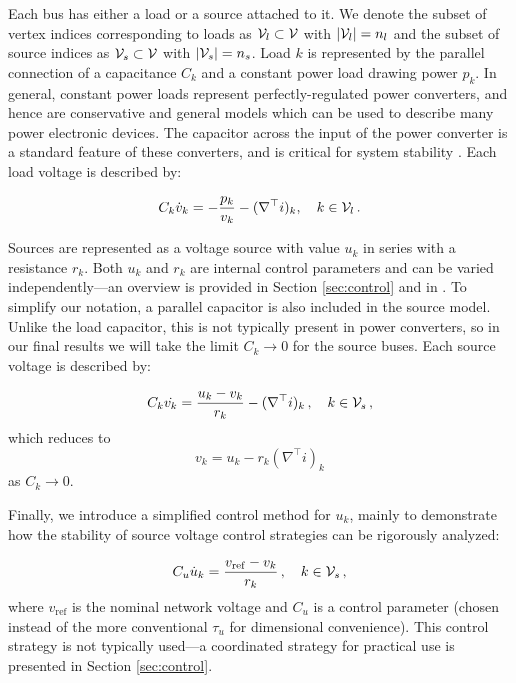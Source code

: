 \documentclass[letterpaper, 10 pt, conference]{ieeeconf}
\begin{document}
Each bus has either a load or a source attached to it. We denote the subset of vertex indices corresponding to loads as ${\cal V}_l \subset {\cal V}$ with $|{\cal V}_l| = n_l$ and the subset of source indices as ${\cal V}_s \subset {\cal V}$ with $|{\cal V}_s| = n_s$. Load $k$ is represented by the parallel connection of a capacitance $C_k$ and a constant power load drawing power $p_k$. In general, constant power loads represent perfectly-regulated power converters, and hence are conservative and general models which can be used to describe many power electronic devices. The capacitor across the input of the power converter is a standard feature of these converters, and is critical for system stability \cite{Cezar:2015io}. Each load voltage is described by:

\begin{equation}
    C_k \dot{v}_k = -\frac{p_k}{v_k} - (\nabla^\top i)_k, \quad k \in {\cal V}_l\,.
\end{equation}

Sources are represented as a voltage source with value $u_k$ in series with a resistance $r_k$. Both $u_k$ and $r_k$ are internal control parameters and can be varied independently---an overview is provided in Section \ref{sec:control} and in \cite{GuerreroHierarchy,GuerreroDroop}. To simplify our notation, a parallel capacitor is also included in the source model. Unlike the load capacitor, this is not typically present in power converters, so in our final results we will take the limit $C_k \to 0$ for the source buses. Each source voltage is described by:

\begin{equation}
    C_k \dot{v_k} = \frac{u_k - v_k}{r_k} - (\nabla^\top i)_k\,, \quad k \in {\cal V}_s\,,
\end{equation}
which reduces to 
\begin{equation}\label{eq:alg}
    v_k = u_k - r_k (\nabla^\top i)_k    
\end{equation}
as $C_k \to 0$.

Finally, we introduce a simplified control method for $u_k$, mainly to demonstrate how the stability of source voltage control strategies can be rigorously analyzed:

\begin{equation} \label{eq:dudt}
    C_u \dot{u}_k = \frac{v_{\mathrm{ref}} - v_k}{r_k}\,, \quad k \in {\cal V}_s\,,
\end{equation}
where $v_{\mathrm{ref}}$ is the nominal network voltage and $C_u$ is a control parameter (chosen instead of the more conventional $\tau_u$ for dimensional convenience). This control strategy is not typically used---a coordinated strategy for practical use is presented in Section \ref{sec:control}.
\end{document}
